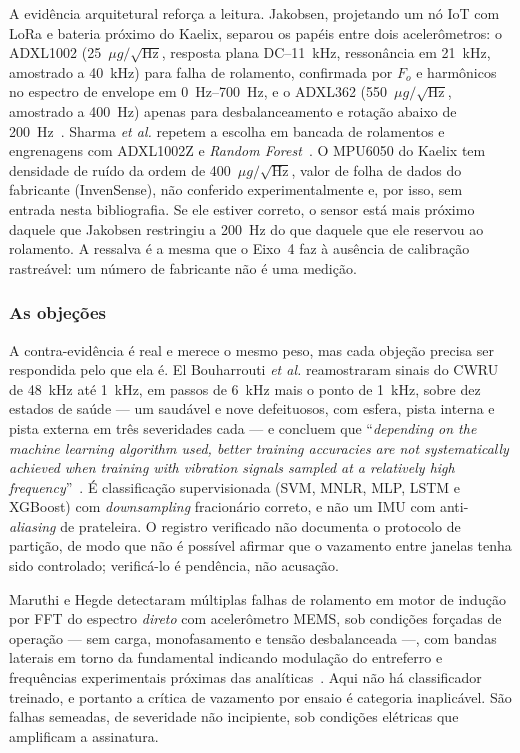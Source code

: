 \documentclass[11pt,a4paper]{article}
\newcommand{\dens}{\ensuremath{\mu g/\sqrt{\mathrm{Hz}}}}
\begin{document}
A evidência arquitetural reforça a leitura. Jakobsen, projetando um nó IoT
com LoRa e bateria próximo do Kaelix, separou os papéis entre dois acelerômetros: o
ADXL1002 (\num{25}~\dens, resposta plana DC--\SI{11}{\kilo\hertz}, ressonância em
\SI{21}{\kilo\hertz}, amostrado a \SI{40}{\kilo\hertz}) para falha de rolamento,
confirmada por $F_o$ e harmônicos no espectro de envelope em \SIrange{0}{700}{\hertz}, e o
ADXL362 (\num{550}~\dens, amostrado a \SI{400}{\hertz}) apenas para desbalanceamento e
rotação abaixo de \SI{200}{\hertz}~\cite{jakobsen2024}. Sharma \emph{et al.} repetem a
escolha em bancada de rolamentos e engrenagens com ADXL1002Z e \textit{Random
Forest}~\cite{sharma2024}. O MPU6050 do Kaelix tem densidade de ruído da ordem de
\num{400}~\dens{}, valor de folha de dados do fabricante (InvenSense), não conferido
experimentalmente e, por isso, sem entrada nesta bibliografia. Se ele estiver correto, o
sensor está mais próximo daquele que Jakobsen restringiu a
\SI{200}{\hertz} do que daquele que ele reservou ao rolamento. A ressalva é a mesma que o
Eixo~4 faz à ausência de calibração rastreável: um número de fabricante não é uma medição.

\subsubsection{As objeções}

A contra-evidência é real e merece o mesmo peso, mas cada objeção precisa ser respondida
pelo que ela é. El Bouharrouti \emph{et al.} reamostraram sinais do CWRU de
\SI{48}{\kilo\hertz} até \SI{1}{\kilo\hertz}, em passos de \SI{6}{\kilo\hertz} mais o
ponto de \SI{1}{\kilo\hertz}, sobre dez estados de saúde --- um saudável e nove
defeituosos, com esfera, pista interna e pista externa em três severidades cada --- e
concluem que ``\textit{depending on the machine learning algorithm used, better training
accuracies are not systematically achieved when training with vibration signals sampled at
a relatively high frequency}''~\cite{elbouharrouti2024}. É classificação supervisionada
(SVM, MNLR, MLP, LSTM e XGBoost) com \textit{downsampling} fracionário correto, e não
um IMU com anti-\textit{aliasing} de prateleira. O registro verificado não documenta o
protocolo de partição, de modo que não é possível afirmar que o vazamento entre janelas
tenha sido controlado; verificá-lo é pendência, não acusação.

Maruthi e Hegde detectaram múltiplas falhas de rolamento em motor de indução por
FFT do espectro \emph{direto} com acelerômetro MEMS, sob condições forçadas de operação
--- sem carga, monofasamento e tensão desbalanceada ---, com bandas laterais em torno da
fundamental indicando modulação do entreferro e frequências experimentais próximas das
analíticas~\cite{maruthi2016}. Aqui não há classificador treinado, e portanto a crítica de
vazamento por ensaio é categoria inaplicável. São falhas semeadas, de severidade não incipiente, sob condições elétricas que amplificam a
assinatura.
\end{document}
